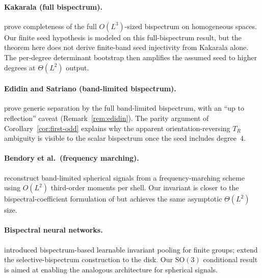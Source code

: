 \documentclass[11pt]{article}
\theoremstyle{plain}
\theoremstyle{definition}
\theoremstyle{remark}
\newcommand{\SO}{\mathrm{SO}}
\begin{document}
\paragraph{Kakarala (full bispectrum).}
\citet{kakarala1992triple,kakarala2012bispectrum} prove completeness
of the full $O(L^3)$-sized bispectrum on homogeneous spaces.
Our finite seed hypothesis is modeled on this full-bispectrum result,
but the theorem here does not derive finite-band seed injectivity from
Kakarala alone. The per-degree determinant bootstrap then amplifies
the assumed seed to higher degrees at $\Theta(L^2)$ output.

\paragraph{Edidin and Satriano (band-limited bispectrum).}
\citet{edidin2024orbit} prove generic separation by the full
band-limited bispectrum, with an ``up to reflection'' caveat
(Remark~\ref{rem:edidin}). The parity argument of
Corollary~\ref{cor:first-odd} explains why the apparent
orientation-reversing $T_R$ ambiguity is visible to the scalar
bispectrum once the seed includes degree~$4$.

\paragraph{Bendory et al.\ (frequency marching).}
\citet{bendory2025orbit} reconstruct band-limited spherical signals
from a frequency-marching scheme using $O(L^2)$ third-order moments
per shell. Our invariant is closer to the bispectral-coefficient
formulation of \citet{kakarala2012bispectrum} but achieves the same
asymptotic $\Theta(L^2)$ size.

\paragraph{Bispectral neural networks.}
\citet{sanborn2023bispectral} introduced bispectrum-based learnable
invariant pooling for finite groups; \citet{myers2025selective}
extend the selective-bispectrum construction to the disk. Our $\SO(3)$
conditional result is aimed at enabling the analogous architecture for
spherical signals.



\end{document}
